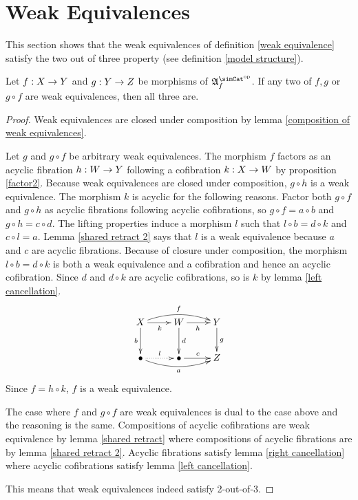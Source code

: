 \documentclass[csh.tex]{subfiles}
\begin{document}
\section{Weak Equivalences}
This section shows that the weak equivalences of definition \ref{weak equivalence} satisfy the two out of three property (see definition \ref{model structure}).

\begin{lemma}[2-out-of-3] Let $f: X\to Y$ and $g: Y\to Z$ be morphisms of $\ambient\s\f$. If any two of $f,g$ or $g\circ f$ are weak equivalences, then all three are. \label{toot}\end{lemma}

\begin{proof} Weak equivalences are closed under composition by lemma \ref{composition of weak equivalences}.

Let $g$ and $g\circ f$ be arbitrary weak equivalences. The morphism $f$ factors as an acyclic fibration $h: W\to Y$ following a cofibration $k: X\to W$ by proposition \ref{factor2}. Because weak equivalences are closed under composition, $g\circ h$ is a weak equivalence. The morphism $k$ is acyclic for the following reasons. Factor both $g\circ f$ and $g\circ h$ as acyclic fibrations following acyclic cofibrations, so $g\circ f = a\circ b$ and $g\circ h = c\circ d$. The lifting properties induce a morphism $l$ such that $l\circ b = d\circ k$ and $c\circ l = a$. Lemma \ref{shared retract 2} says that $l$ is a weak equivalence because $a$ and $c$ are acyclic fibrations. 
Because of closure under composition, the morphism $l\circ b = d\circ k$ is both a weak equivalence and a cofibration and hence an acyclic cofibration. Since $d$ and $d\circ k$ are acyclic cofibrations, so is $k$ by lemma \ref{left cancellation}.
\[\xymatrix{
X\ar[r]_k\ar@/^2ex/[rr]^f\ar[d]_b & W\ar[r]_h\ar[d]^d & Y\ar[d]^g \\
\bullet\ar@/_2ex/[rr]_a\ar@{.>}[r]^l & \bullet\ar[r]^c & Z
}\]
Since $f = h\circ k$, $f$ is a weak equivalence.

The case where $f$ and $g\circ f$ are weak equivalences is dual to the case above and the reasoning is the same. Compositions of acyclic cofibrations are weak equivalence by lemma \ref{shared retract} where compositions of acyclic fibrations are by lemma \ref{shared retract 2}. Acyclic fibrations satisfy lemma \ref{right cancellation} where acyclic cofibrations satisfy lemma \ref{left cancellation}.

This means that weak equivalences indeed satisfy 2-out-of-3.
\end{proof}
\end{document}
